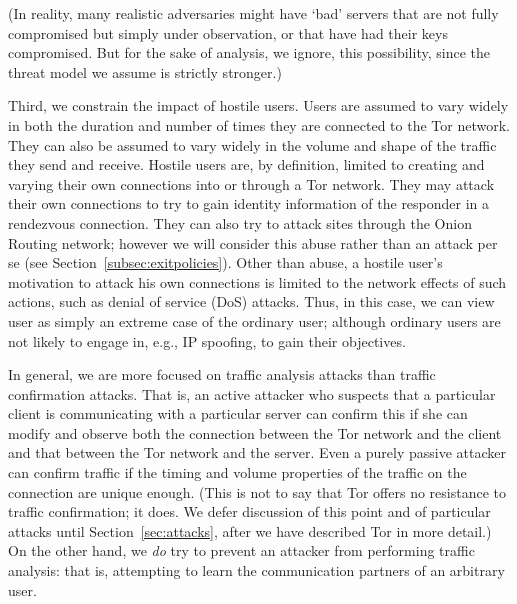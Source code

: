 \documentclass[times,10pt,twocolumn]{article}
\begin{document}
(In reality, many realistic adversaries might have `bad' servers that are not
fully compromised but simply under observation, or that have had their keys
compromised.  But for the sake of analysis, we ignore, this possibility,
since the threat model we assume is strictly stronger.)

Third, we constrain the impact of hostile users.  Users are assumed to vary
widely in both the duration and number of times they are connected to the Tor
network. They can also be assumed to vary widely in the volume and shape of
the traffic they send and receive. Hostile users are, by definition, limited
to creating and varying their own connections into or through a Tor
network. They may attack their own connections to try to gain identity
information of the responder in a rendezvous connection. They can also try to
attack sites through the Onion Routing network; however we will consider this
abuse rather than an attack per se (see
Section~\ref{subsec:exitpolicies}). Other than abuse, a hostile user's
motivation to attack his own connections is limited to the network effects of
such actions, such as denial of service (DoS) attacks.  Thus, in this case,
we can view user as simply an extreme case of the ordinary user; although
ordinary users are not likely to engage in, e.g., IP spoofing, to gain their
objectives.

In general, we are more focused on traffic analysis attacks than
traffic confirmation attacks. 
That is, an active attacker who suspects that
a particular client is communicating with a particular server can
confirm this if she can modify and observe both the
connection between the Tor network and the client and that between the
Tor network and the server. Even a purely passive attacker can
confirm traffic if the timing and volume properties of the traffic on
the connection are unique enough.  (This is not to say that Tor offers
no resistance to traffic confirmation; it does.  We defer discussion
of this point and of particular attacks until Section~\ref{sec:attacks},
after we have described Tor in more detail.)
On the other hand, we {\it do} try to prevent an attacker from
performing traffic analysis: that is, attempting to learn the communication
partners of an arbitrary user.
\end{document}
